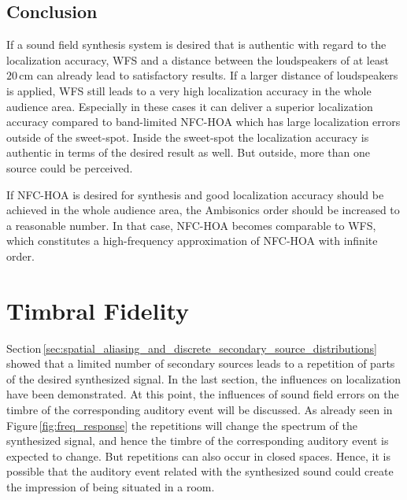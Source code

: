 \subsection{Conclusion}
\label{sec:localization_conclusion}
%
If a sound field synthesis system is desired that is authentic with regard to the
localization accuracy, \ac{WFS} and a
distance between the loudspeakers of at least $20$\,cm can already lead to
satisfactory results.
If a larger distance of loudspeakers is applied, \ac{WFS} still leads to a very
high localization accuracy in the whole audience area. Especially in these cases
it can deliver a superior localization accuracy compared to band-limited
\ac{NFC-HOA} which has large localization errors outside of the sweet-spot.
Inside the sweet-spot the localization accuracy is authentic in terms of the
desired result as well.
But outside, more than one source could be perceived. 

If \ac{NFC-HOA} is desired for synthesis and good localization
accuracy should be achieved in the whole audience area, the Ambisonics order
should be increased to a reasonable number. In that case,
\ac{NFC-HOA} becomes comparable to \ac{WFS}, which constitutes a high-frequency
approximation of \ac{NFC-HOA} with infinite order.



\section[Timbral Fidelity]{Timbral Fidelity\autocite[This experiment
was published in a slightly modified way in][the presented experiment was carried
out in coorperation with Christoph Hohnerlein as part of his Bachelor
thesis]{Wierstorf2014}}
\label{sec:timbral_fidelity}

Section\,\ref{sec:spatial_aliasing_and_discrete_secondary_source_distributions}
showed that a limited number of secondary sources leads to a repetition of parts
of the desired synthesized signal. In the last section, the
influences on localization have been demonstrated. At this point, the influences
of sound field errors on the
timbre of the corresponding auditory event will be discussed. As already seen in
Figure\,\ref{fig:freq_response} the repetitions will change the spectrum of the
synthesized signal, and hence the timbre of the corresponding auditory event
is expected to change. But repetitions can also occur in closed spaces.
Hence, it is possible that the auditory event related with the
synthesized sound could create the impression of being situated in a room.

